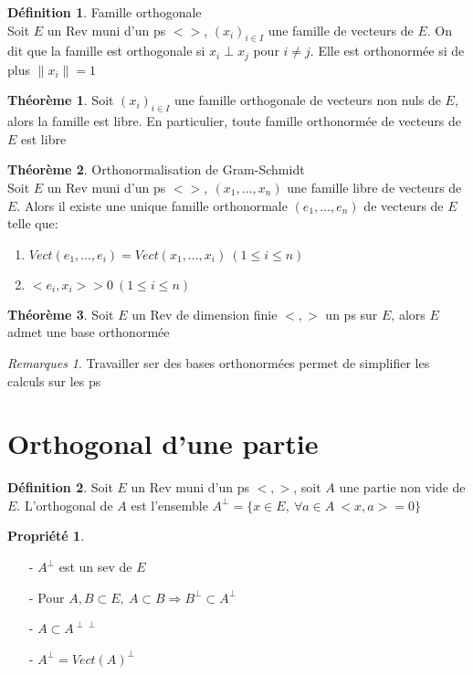 \documentclass[fleqn]{article}
\theoremstyle{definition} \newtheorem*{defi}{D\'efinition}
\theoremstyle{definition} \newtheorem*{theo}{Th\'eor\`eme}
\theoremstyle{definition} \newtheorem*{coro}{Corollaire}
\theoremstyle{remark} \newtheorem*{rqs}{Remarques}
\theoremstyle{definition} \newtheorem*{prop}{Propri\'et\'e}
\begin{document}
\begin{defi} Famille orthogonale \\
Soit $E$ un Rev muni d'un ps $<>$, $(x_i)_{i\in I}$ une famille de vecteurs de $E$. On dit que la famille est orthogonale si
$x_i \perp x_j$ pour $i\neq j$. Elle est orthonorm\'ee si de plus $\|x_i\| = 1$
\end{defi}

\begin{theo} Soit $(x_i)_{i\in I}$ une famille orthogonale de vecteurs non nuls de $E$, alors la famille est libre. En particulier, toute famille
orthonorm\'ee de vecteurs de $E$ est libre
\end{theo}

\begin{theo} Orthonormalisation de Gram-Schmidt \\
Soit $E$ un Rev muni d'un ps $<>,\ (x_1, \hdots, x_n)$ une famille libre de vecteurs de $E$. Alors il existe une unique famille orthonormale
$(e_1, \hdots, e_n)$ de vecteurs de $E$ telle que:
\begin{enumerate}
	\item $Vect(e_1, \hdots, e_i) = Vect(x_1, \hdots, x_i)\ (1 \leq i \leq n)$
	\item $<e_i,x_i> >0\ (1 \leq i \leq n)$
\end{enumerate}
\end{theo}

\begin{theo} Soit $E$ un Rev de dimension finie  $<,>$ un ps sur $E$, alors $E$ admet une base orthonorm\'ee
	\begin{rqs}
	Travailler ser des bases orthonorm\'ees permet de simplifier les calculs sur les ps
	\end{rqs}
\end{theo}

\section{Orthogonal d'une partie}
\begin{defi} Soit $E$ un Rev muni d'un ps $<,>$, soit $A$ une partie non vide de $E$. L'orthogonal de $A$ est l'ensemble $A^{\perp} =
	\{x \in E,\ \forall a \in A\ <x,a> = 0\}$
\end{defi}

\begin{prop} $ $
	\begin{enumerate}
		\item [-] $A^{\perp}$ est un sev de $E$
		\item [-] Pour $A,B \subset E,\ A \subset B \Rightarrow B^\perp \subset A^\perp$
		\item [-] $A \subset A^{\perp \perp}$
		\item [-] $A^\perp = Vect(A)^\perp$
	\end{enumerate}
\end{prop}
\end{document}
